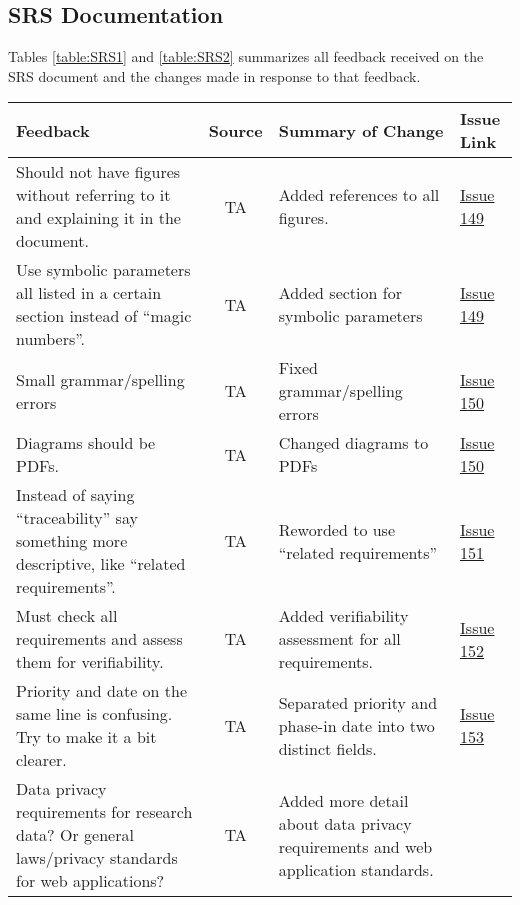 \documentclass{article}
\begin{document}
\subsection{SRS Documentation}
Tables \ref{table:SRS1} and \ref{table:SRS2} summarizes all feedback received on
the SRS document and the changes made in response to that feedback.
\begin{table}[H]
\centering
\begin{tabularx}{\textwidth}{|X|c|X|p{1cm}|}
    \hline
    \textbf{Feedback} & \textbf{Source} & \textbf{Summary of Change} &
    \textbf{Issue Link} \\
    \hline
    Should not have figures without referring to it and explaining it in the
    document. & TA & Added references to all figures. &
    \href{https://github.com/SumanyaG/Alkalytics/issues/149}{Issue 149} \\
    \hline
    Use symbolic parameters all listed in a certain section instead of ``magic
    numbers''. & TA & Added section for symbolic parameters &
    \href{https://github.com/SumanyaG/Alkalytics/issues/149}{Issue 149} \\
    \hline
    Small grammar/spelling errors & TA & Fixed grammar/spelling errors &
    \href{https://github.com/SumanyaG/Alkalytics/issues/150}{Issue 150} \\
    \hline
    Diagrams should be PDFs. & TA & Changed diagrams to PDFs &
    \href{https://github.com/SumanyaG/Alkalytics/issues/150}{Issue 150} \\
    \hline
    Instead of saying ``traceability'' say something more descriptive, like
    ``related requirements''. & TA & Reworded to use ``related requirements'' &
    \href{https://github.com/SumanyaG/Alkalytics/issues/151}{Issue 151} \\
    \hline
    Must check all requirements and assess them for verifiability. & TA & Added
    verifiability assessment for all requirements. &
    \href{https://github.com/SumanyaG/Alkalytics/issues/152}{Issue 152} \\
    \hline
    Priority and date on the same line is confusing. Try to make it a bit
    clearer. & TA & Separated priority and phase-in date into two distinct
    fields. & \href{https://github.com/SumanyaG/Alkalytics/issues/153}{Issue
    153} \\
    \hline
    Data privacy requirements for research data? Or general laws/privacy
    standards for web applications? & TA & Added more detail about data privacy
    requirements and web application standards. &

\end{tabularx}
\end{table}
\end{document}
